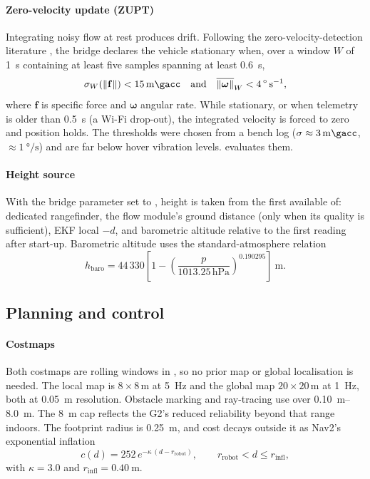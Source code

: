 \paragraph{Zero-velocity update (ZUPT)} Integrating noisy flow at rest produces drift. Following the
zero-velocity-detection literature \cite{foxlin2005pedestrian,skog2010zupt}, the
bridge declares the vehicle stationary when, over a window $W$ of
\SI{1}{\second} containing at least five samples spanning at least \SI{0.6}{\second},
\begin{equation}
  \sigma_W\!\left(\lVert\mathbf{f}\rVert\right) < \SI{15}{\milli\gacc}
  \quad\text{and}\quad
  \overline{\lVert\bm{\omega}\rVert}_W < \SI{4}{\degree\per\second},
  \label{eq:zupt}
\end{equation}
where $\mathbf{f}$ is specific force and $\bm{\omega}$ angular rate. While stationary,
or when telemetry is older than \SI{0.5}{\second} (a Wi-Fi drop-out), the integrated
velocity is forced to zero and position holds. The thresholds were chosen from a bench
log ($\sigma\approx\SI{3}{\milli\gacc}$, $\approx\SI{1}{\degree\per\second}$) and are
far below hover vibration levels.  evaluates them.

\paragraph{Height source} With the bridge parameter  set to , height is taken from the first
available of: dedicated rangefinder, the flow module's ground distance (only when its
quality is sufficient), EKF local $-d$, and barometric altitude relative to the first
reading after start-up. Barometric altitude uses the standard-atmosphere relation
\cite{icao1993atmosphere}
\begin{equation}
  h_\text{baro} = 44\,330\left[1-\left(\frac{p}{1013.25\,\text{hPa}}\right)^{0.190295}\right]\ \text{m}.
  \label{eq:baro}
\end{equation}

\subsection{Planning and control}

\paragraph{Costmaps} Both costmaps are rolling windows in , so no prior map
or global localisation is needed. The local map is $8\times8$\,m at
\SI{5}{\hertz} and the global map $20\times20$\,m at \SI{1}{\hertz}, both at
\SI{0.05}{\metre} resolution. Obstacle marking and ray-tracing use  over
\SIrange{0.10}{8.0}{\metre}. The \SI{8}{\metre} cap reflects the G2's reduced
reliability beyond that range indoors. The footprint radius is \SI{0.25}{\metre},
and cost decays outside it as Nav2's exponential inflation
\begin{equation}
  c(d) = 252\, e^{-\kappa\,(d - r_\text{robot})}, \qquad
  r_\text{robot} < d \le r_\text{infl},
  \label{eq:inflation}
\end{equation}
with $\kappa=3.0$ and $r_\text{infl}=\SI{0.40}{\metre}$.

